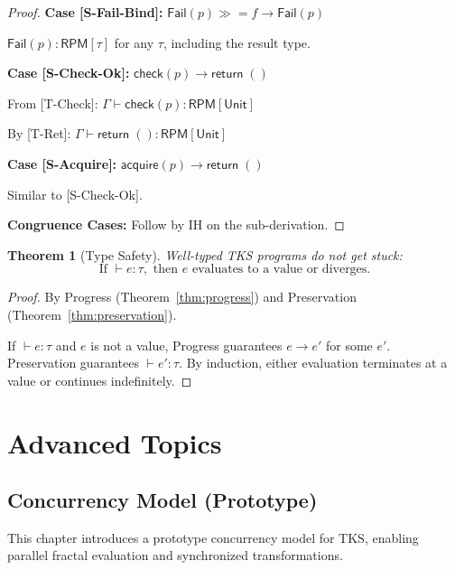 \documentclass[11pt,twoside,openright]{book}
\theoremstyle{definition}
\theoremstyle{plain}
\newtheorem{theorem}[definition]{Theorem}
\theoremstyle{remark}
\newcommand{\rpmret}{\mathsf{return}}
\newcommand{\rpmbind}{\mathbin{\gg\!=}}
\newcommand{\smallstep}{\to}
\newcommand{\Failed}{\mathsf{Fail}}
\newcommand{\vnew}{\textcolor{blue!70!black}{\textbf{[NEW v7.0]}}}
\begin{document}
\begin{proof}
\textbf{Case [S-Fail-Bind]:} $\Failed(p) \rpmbind f \smallstep \Failed(p)$

$\Failed(p) : \mathsf{RPM}[\tau]$ for any $\tau$, including the result type. \checkmark

\textbf{Case [S-Check-Ok]:} $\mathsf{check}(p) \smallstep \rpmret\; ()$

From [T-Check]: $\Gamma \vdash \mathsf{check}(p) : \mathsf{RPM}[\mathsf{Unit}]$

By [T-Ret]: $\Gamma \vdash \rpmret\; () : \mathsf{RPM}[\mathsf{Unit}]$ \checkmark

\textbf{Case [S-Acquire]:} $\mathsf{acquire}(p) \smallstep \rpmret\; ()$

Similar to [S-Check-Ok]. \checkmark

\textbf{Congruence Cases:} Follow by IH on the sub-derivation.
\end{proof}

\begin{theorem}[Type Safety]
\label{thm:type-safety}
Well-typed TKS programs do not get stuck:
\[
\text{If } \vdash e : \tau, \text{ then } e \text{ evaluates to a value or diverges.}
\]
\end{theorem}

\begin{proof}
By Progress (Theorem~\ref{thm:progress}) and Preservation (Theorem~\ref{thm:preservation}).

If $\vdash e : \tau$ and $e$ is not a value, Progress guarantees $e \smallstep e'$ for some $e'$. Preservation guarantees $\vdash e' : \tau$. By induction, either evaluation terminates at a value or continues indefinitely.
\end{proof}

\part{Advanced Topics}

\chapter{Concurrency Model (Prototype)}
\label{ch:concurrency}

\begin{tcolorbox}[colback=blue!5!white,colframe=blue!75!black,title=\vnew]
This chapter introduces a prototype concurrency model for TKS, enabling parallel fractal evaluation and synchronized transformations.
\end{tcolorbox}
\end{document}

